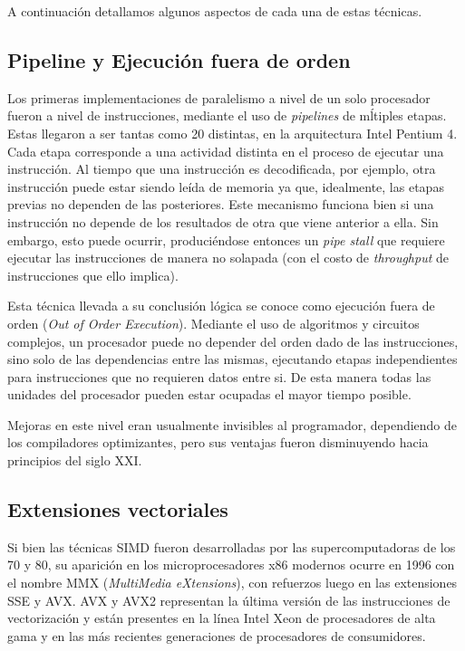A continuaci\'on detallamos algunos aspectos de cada una de estas t\'ecnicas.

\subsection{Pipeline y Ejecuci\'on fuera de orden}

Los primeras implementaciones de paralelismo a nivel de un solo procesador fueron a nivel de instrucciones, mediante el uso
de \textit{pipelines} de m\'ltiples etapas. Estas llegaron a ser tantas como 20 distintas, en la arquitectura
Intel Pentium 4. Cada etapa corresponde a una actividad distinta en el proceso de ejecutar una instrucci\'on.
Al tiempo que una instrucci\'on es decodificada, por ejemplo, otra instrucci\'on puede estar siendo le\'ida
de memoria ya que, idealmente, las etapas previas no dependen de las posteriores. Este mecanismo funciona bien
si una instrucci\'on no depende de los resultados de otra que viene anterior a ella. Sin embargo, esto puede
ocurrir, produci\'endose entonces un \textit{pipe stall} que requiere ejecutar las instrucciones de manera no solapada
(con el costo de \textit{throughput} de instrucciones que ello implica).

Esta t\'ecnica llevada a su conclusi\'on l\'ogica se conoce como ejecuci\'on fuera de orden (\textit{Out of Order
Execution}). Mediante el uso de algoritmos y circuitos complejos, un procesador puede no depender del orden dado
de las instrucciones, sino solo de las dependencias entre las mismas, ejecutando etapas independientes para
instrucciones que no requieren datos entre si. De esta manera todas las unidades del procesador pueden estar
ocupadas el mayor tiempo posible.

Mejoras en este nivel eran usualmente invisibles al programador, dependiendo de los compiladores optimizantes,
pero sus ventajas fueron disminuyendo hacia principios del siglo XXI.

\subsection{Extensiones vectoriales}

Si bien las t\'ecnicas SIMD fueron desarrolladas por las supercomputadoras de los 70 y 80, su aparici\'on en los
microprocesadores x86 modernos ocurre en 1996 con el nombre MMX (\textit{MultiMedia eXtensions}), con refuerzos luego en las
extensiones SSE y AVX. AVX y AVX2 representan la \'ultima versi\'on de las instrucciones de vectorizaci\'on y est\'an presentes
en la l\'inea Intel Xeon de procesadores de alta gama y en las m\'as recientes generaciones de procesadores de consumidores.

